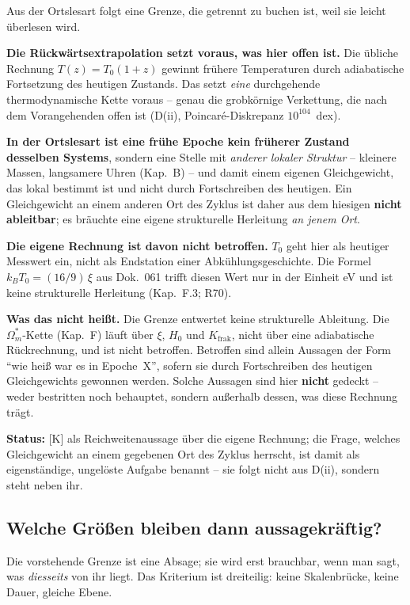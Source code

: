 Aus der Ortslesart folgt eine Grenze, die getrennt zu buchen ist,
weil sie leicht überlesen wird.

\textbf{Die Rückwärtsextrapolation setzt voraus, was hier offen
ist.} Die übliche Rechnung $T(z) = T_0(1+z)$ gewinnt frühere
Temperaturen durch adiabatische Fortsetzung des heutigen
Zustands. Das setzt \emph{eine} durchgehende thermodynamische
Kette voraus -- genau die grobkörnige Verkettung, die nach dem
Vorangehenden offen ist (D(ii), Poincaré-Diskrepanz
$10^{104}$~dex).

\textbf{In der Ortslesart ist eine frühe Epoche kein früherer
Zustand desselben Systems}, sondern eine Stelle mit \emph{anderer
lokaler Struktur} -- kleinere Massen, langsamere Uhren (Kap.~B) --
und damit einem eigenen Gleichgewicht, das lokal bestimmt ist und
nicht durch Fortschreiben des heutigen. Ein Gleichgewicht an
einem anderen Ort des Zyklus ist daher aus dem hiesigen
\textbf{nicht ableitbar}; es bräuchte eine eigene strukturelle
Herleitung \emph{an jenem Ort}.

\textbf{Die eigene Rechnung ist davon nicht betroffen.} $T_0$
geht hier als heutiger Messwert ein, nicht als Endstation einer
Abkühlungsgeschichte. Die Formel $k_BT_0 = (16/9)\,\xi$ aus
Dok.~061 trifft diesen Wert nur in der Einheit eV und ist keine
strukturelle Herleitung (Kap.~F.3; R70).

\textbf{Was das nicht heißt.} Die Grenze entwertet keine
strukturelle Ableitung. Die $\Omega_m^{*}$-Kette (Kap.~F) läuft
über $\xi$, $H_0$ und $K_\text{frak}$, nicht über eine
adiabatische Rückrechnung, und ist nicht betroffen. Betroffen
sind allein Aussagen der Form \enquote{wie heiß war es in
Epoche~X}, sofern sie durch Fortschreiben des heutigen
Gleichgewichts gewonnen werden. Solche Aussagen sind hier
\textbf{nicht} gedeckt -- weder bestritten noch behauptet,
sondern außerhalb dessen, was diese Rechnung trägt.

\textbf{Status:} [K] als Reichweitenaussage über die eigene
Rechnung; die Frage, welches Gleichgewicht an einem gegebenen Ort
des Zyklus herrscht, ist damit als eigenständige, ungelöste
Aufgabe benannt -- sie folgt nicht aus D(ii), sondern steht neben
ihr.

\subsection*{Welche Größen bleiben dann aussagekräftig?}

Die vorstehende Grenze ist eine Absage; sie wird erst brauchbar,
wenn man sagt, was \emph{diesseits} von ihr liegt. Das Kriterium
ist dreiteilig: keine Skalenbrücke, keine Dauer, gleiche Ebene.

